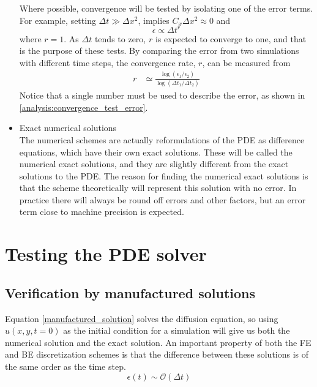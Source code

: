 \begin{itemize}
Where possible, convergence will be tested by isolating one of the error terms. For example, setting $\Delta t \gg \Delta x^2$, implies $C_x\Delta x^2\approx0$ and 
$$
\epsilon \propto \Delta t^r
$$
where $r=1$. 
As $\Delta t$ tends to zero, $r$ is expected to converge to one, and that is the purpose of these tests. 
By comparing the error from two simulations with different time steps, the convergence rate, $r$, can be measured from 
 \begin{align*}
   r&\simeq \frac{\log\left(\epsilon_1/\epsilon_2\right)}{\log\left(\Delta t_1/\Delta t_2\right)}
\end{align*}
Notice that a single number must be used to describe the error, as shown in \eqref{analysis:convergence_test_error}.

  \item Exact numerical solutions \\
  The numerical schemes are actually reformulations of the PDE as difference equations, which have their own exact solutions. 
  These will be called the numerical exact solutions, and they are slightly different from the exact solutions to the PDE. 
  The reason for finding the numerical exact solutions is that the scheme theoretically will represent this solution with no error. 
  In practice there will always be round off errors and other factors, but an error term close to machine precision is expected.
\end{itemize}

\section{Testing the PDE solver}


\subsection{Verification by manufactured solutions}\label{analysis:section_manufactured_solution}

Equation \eqref{manufactured_solution} solves the diffusion equation, so using $u(x,y,t=0)$ as the initial condition for a simulation will give us both the numerical solution and the exact solution. 
An important property of both the FE and BE discretization schemes is that the difference between these solutions is of the same order as the time step.
\begin{equation*}
 \epsilon(t) \sim \mathcal{O}(\Delta t)
\end{equation*}

